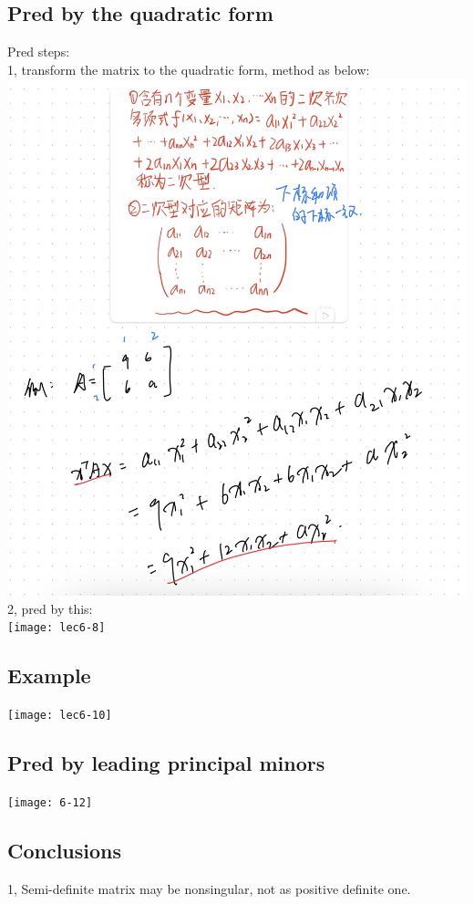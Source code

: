 \documentclass{article}
\begin{document}
\subsection{Pred by the quadratic form}
Pred steps:\\
1, transform the matrix to the quadratic form, method as below:\\
\includegraphics[width=1\linewidth]{lec6-7}\\
2, pred by this:\\
\texttt{[image: lec6-8]}\\

\subsection*{Example}
\texttt{[image: lec6-10]}\\


\subsection{Pred by leading principal minors}
\texttt{[image: 6-12]}\\

\subsection{Conclusions}
1, Semi-definite matrix may be nonsingular, not as positive definite one.
\end{document}
